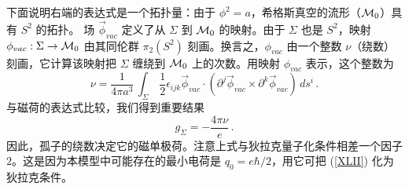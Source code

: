 下面说明右端的表达式是一个拓扑量：由于 $\phi^2=a$，希格斯真空的流形（${\cal M}_0$）具有 $S^2$ 的拓扑。
场 $\vec{\phi}_{vac}$ 定义了从 $\Sigma$ 到 ${\cal M}_0$ 的映射。由于 $\Sigma$ 也是 $S^2$，映射 $\phi_{vac}:\Sigma\rightarrow{\cal M}_0$ 由其同伦群 $\pi_2 (S^2)$ 刻画。换言之，$\phi_{vac}$ 由一个整数 $\nu$（绕数）刻画，它计算该映射把 $\Sigma$ 缠绕到 ${\cal M}_0$ 上的次数。用映射 $\phi_{vac}$ 表示，这个整数为
\begin{equation}
\nu = \frac{1}{4\pi a^{3}} \, \int_\Sigma\,\frac{1}{2}
\epsilon_{ijk}\vec{\phi}_{vac}\cdot\left(\partial^j\vec{\phi}_{vac}
\times \partial^k\vec{\phi}_{vac}\right)\,d s^i\,.
\label{XLI}
\end{equation}
与磁荷的表达式比较，我们得到重要结果
\begin{equation}
g_{\Sigma} = - \frac{4\pi \nu}{e}\,.
\label{XLII}
\end{equation}
因此，孤子的绕数决定它的磁单极荷。注意上式与狄拉克量子化条件相差一个因子 $2$。这是因为本模型中可能存在的最小电荷是 $q_0=e\hbar/2$，用它可把 (\ref{XLII}) 化为狄拉克条件。

